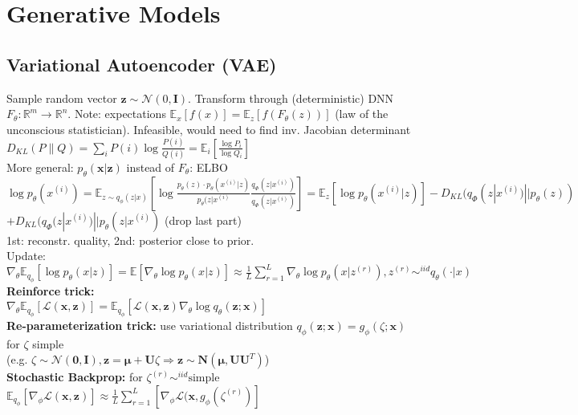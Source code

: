 \section*{Generative Models}
\subsection*{Variational Autoencoder (VAE)}
Sample random vector $\mathbf{z} \sim \mathcal{N}(0,\mathbf{I})$. Transform through (deterministic) DNN $F_\theta : \mathbb{R}^m \to \mathbb{R}^n$. Note: expectations $\mathbb{E}_x[f(x)] = \mathbb{E}_z [f(F_\theta(z))]$ (law of the unconscious statistician). Infeasible, would need to find inv. Jacobian determinant\\
$D_{KL}(P\|Q)=\sum_i P(i)\log\frac{P(i)}{Q(i)}=\mathbb{E}_i [\frac{\log P_i}{\log Q_i}]$ \\
More general: $p_\theta (\mathbf{x}|\mathbf{z}) $ instead of $F_\theta$: ELBO \\
$\log p_\theta(x^{(i)})
= \mathbb{E}_{z \sim q_\phi (z|x)} \left[\log \frac{p_\theta(z) \cdot p_\theta(x^{(i)}|z)}{p_\theta(z|x^{(i)}}\frac{q_\Phi(z|x^{(i)})}{q_\Phi(z|x^{(i)})} \right] \allowbreak
= \mathbb{E}_z[\log p_\theta (x^{(i)}|z)] - D_{KL}(q_\Phi(z|x^{(i)}) || p_\theta(z))$ \\
$ + D_{KL}(q_\Phi(z|x^{(i)}) || p_\theta(z|x^{(i)})$ (drop last part)\\
1st: reconstr. quality, 2nd: posterior close to prior. \\
Update: $\nabla_\theta \mathbb{E}_{q_\phi}[\log p_\theta(x|z)] = \mathbb{E}[\nabla_\theta \log p_\theta(x|z)] \allowbreak \approx \frac 1 L \sum_{r=1}^L \nabla_\theta \log p_\theta(x|z^{(r)}), z^{(r)} \sim^{iid} q_\theta (\cdot | x) $\\
\textbf{Reinforce trick:}\\
$\nabla_\theta\mathbb{E}_{q_\phi}[\mathcal{L}(\mathbf{x}, \mathbf{z})] = \mathbb{E}_{q_\phi}[\mathcal{L}(\mathbf{x}, \mathbf{z}) \nabla_\theta\log q_\theta(\mathbf{z};\mathbf{x})]$ \\
\textbf{Re-parameterization trick:} use variational distribution  $q_\phi(\mathbf{z};\mathbf{x})=g_\phi(\zeta;\mathbf{x})$ for $\zeta$ simple \\
(e.g. $\zeta \sim \mathcal{N}(\mathbf{0},\mathbf{I}), \mathbf{z}=\mathbf{\mu} + \mathbf{U}\zeta \Rightarrow \mathbf{z}\sim \mathbf{N}(\mathbf{\mu}, \mathbf{UU}^T)$)\\
\textbf{Stochastic Backprop:} for $\zeta^{(r)} \sim^{iid} \text{simple}$ \\
$\mathbb{E}_{q_\phi}[\nabla_\phi\mathcal{L}(\mathbf{x}, \mathbf{z})] \approx \frac 1 L \sum_{r=1}^L [\nabla_\phi \mathcal{L}(\mathbf{x}, g_\phi(\zeta^{(r)})] $ 
